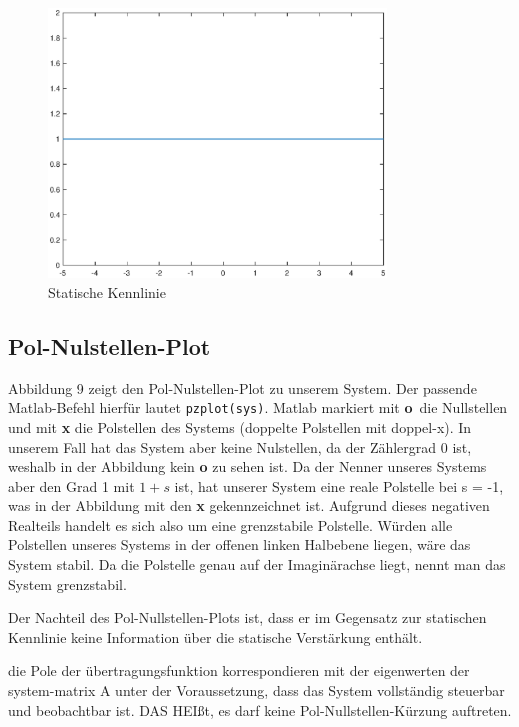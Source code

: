 \begin{figure}[H]
    \label{fig:staticCurve}
    \centering
    \includegraphics[width=0.8\textwidth]{Bilder/StaticCurvePT1Tt.eps}
    \caption{Statische Kennlinie}
 \end{figure}

\subsection{Pol-Nulstellen-Plot}
Abbildung 9 zeigt den Pol-Nulstellen-Plot zu unserem System. Der passende Matlab-Befehl hierfür lautet \texttt{pzplot(sys)}. Matlab markiert mit \textbf{o} die Nullstellen und mit \textbf{x} die Polstellen des Systems (doppelte Polstellen mit doppel-x). In unserem Fall hat das System aber keine Nulstellen, da der Zählergrad 0 ist, weshalb in der Abbildung kein \textbf{o} zu sehen ist. Da der Nenner unseres Systems aber den Grad 1 mit $1 + s$ ist, hat unserer System eine reale Polstelle bei s = -1, was in der Abbildung mit den \textbf{x} gekennzeichnet ist. Aufgrund dieses negativen Realteils handelt es sich also um eine grenzstabile Polstelle. Würden alle Polstellen unseres Systems in der offenen linken Halbebene liegen, wäre das System stabil. Da die Polstelle genau auf der Imaginärachse liegt, nennt man das System grenzstabil.

Der Nachteil des Pol-Nullstellen-Plots ist, dass er im Gegensatz zur statischen Kennlinie keine Information über die statische Verstärkung enthält.

die Pole der übertragungsfunktion korrespondieren mit der eigenwerten der system-matrix A unter der Voraussetzung, dass das System vollständig steuerbar und beobachtbar ist.
DAS HEIßt, es darf keine Pol-Nullstellen-Kürzung auftreten.

